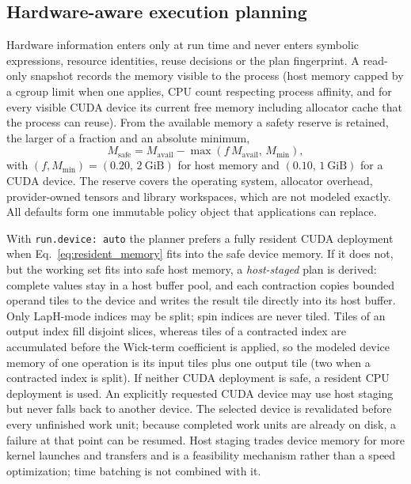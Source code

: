 \documentclass[a4paper,fleqn]{cas-dc}
\begin{document}
\subsection{Hardware-aware execution planning}
\label{sec:hardware_planning}

Hardware information enters only at run time and never enters symbolic
expressions, resource identities, reuse decisions or the plan fingerprint. A
read-only snapshot records the memory visible to the process (host memory capped
by a cgroup limit when one applies, CPU count respecting process affinity, and
for every visible CUDA device its current free memory including allocator cache
that the process can reuse). From the available memory a safety reserve is
retained, the larger of a fraction and an absolute minimum,
\begin{equation}
M_{\mathrm{safe}} = M_{\mathrm{avail}} - \max\!\left(f\,M_{\mathrm{avail}},\,M_{\min}\right),
\label{eq:safe_memory}
\end{equation}
with \((f,M_{\min})=(0.20,\,2~\mathrm{GiB})\) for host memory and
\((0.10,\,1~\mathrm{GiB})\) for a CUDA device.
The reserve covers the operating system, allocator overhead, provider-owned
tensors and library workspaces, which are not modeled exactly. All defaults form
one immutable policy object that applications can replace.

With \texttt{run.device: auto} the planner prefers a fully resident CUDA
deployment when Eq.~\eqref{eq:resident_memory} fits into the safe device memory.
If it does not, but the working set fits into safe host memory, a
\emph{host-staged} plan is derived: complete values stay in a host buffer pool,
and each contraction copies bounded operand tiles to the device and writes the
result tile directly into its host buffer. Only LapH-mode indices may be split;
spin indices are never tiled. Tiles of an output index fill disjoint slices,
whereas tiles of a contracted index are accumulated before the Wick-term
coefficient is applied, so the modeled device memory of one operation is its input
tiles plus one output tile (two when a contracted index is split). If neither
CUDA deployment is safe, a resident CPU deployment is used. An explicitly
requested CUDA device may use host staging but never falls back to another
device. The selected device is revalidated before every unfinished work unit;
because completed work units are already on disk, a failure at that point can be
resumed. Host staging trades device memory for more kernel launches and
transfers and is a feasibility mechanism rather than a speed optimization;
time batching is not combined with it.
\end{document}
